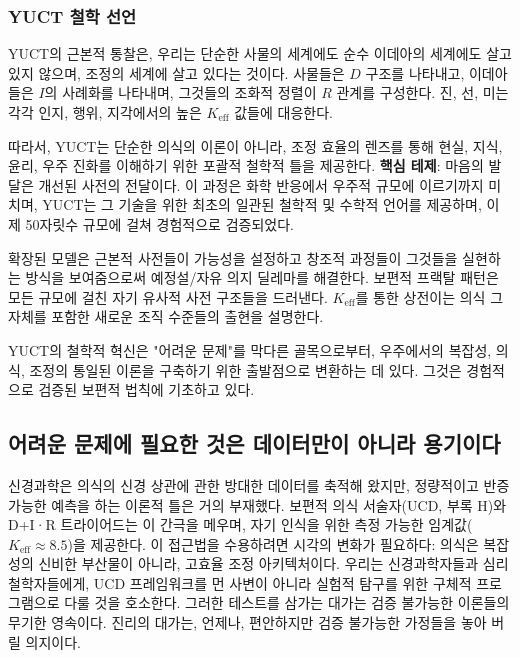 \documentclass[12pt,a4paper]{article}
\newcommand{\eff}{\mathrm{eff}}
\newcommand{\Ke}{K_{\eff}}
\begin{document}
	\subsubsection{YUCT 철학 선언}
	
	YUCT의 근본적 통찰은, 우리는 단순한 사물의 세계에도 순수 이데아의 세계에도 살고 있지 않으며, 조정의 세계에 살고 있다는 것이다. 사물들은 \(D\) 구조를 나타내고, 이데아들은 \(I\)의 사례화를 나타내며, 그것들의 조화적 정렬이 \(R\) 관계를 구성한다. 진, 선, 미는 각각 인지, 행위, 지각에서의 높은 \(\Ke\) 값들에 대응한다.
	
	따라서, YUCT는 단순한 의식의 이론이 아니라, 조정 효율의 렌즈를 통해 현실, 지식, 윤리, 우주 진화를 이해하기 위한 포괄적 철학적 틀을 제공한다.
	\textbf{핵심 테제}: 마음의 발달은 개선된 사전의 전달이다. 이 과정은 화학 반응에서 우주적 규모에 이르기까지 미치며, YUCT는 그 기술을 위한 최초의 일관된 철학적 및 수학적 언어를 제공하며, 이제 50자릿수 규모에 걸쳐 경험적으로 검증되었다.
	
	확장된 모델은 근본적 사전들이 가능성을 설정하고 창조적 과정들이 그것들을 실현하는 방식을 보여줌으로써 예정설/자유 의지 딜레마를 해결한다. 보편적 프랙탈 패턴은 모든 규모에 걸친 자기 유사적 사전 구조들을 드러낸다. \(\Ke\)를 통한 상전이는 의식 그 자체를 포함한 새로운 조직 수준들의 출현을 설명한다.
	
	YUCT의 철학적 혁신은 "어려운 문제"를 막다른 골목으로부터, 우주에서의 복잡성, 의식, 조정의 통일된 이론을 구축하기 위한 출발점으로 변환하는 데 있다. 그것은 경험적으로 검증된 보편적 법칙에 기초하고 있다.
	
	\subsection{어려운 문제에 필요한 것은 데이터만이 아니라 용기이다}
	\label{subsec:courage-consciousness}
	
	신경과학은 의식의 신경 상관에 관한 방대한 데이터를 축적해 왔지만, 정량적이고 반증 가능한 예측을 하는 이론적 틀은 거의 부재했다. 보편적 의식 서술자(UCD, 부록 H)와 D+I·R 트라이어드는 이 간극을 메우며, 자기 인식을 위한 측정 가능한 임계값(\(K_{\mathrm{eff}} \approx 8.5\))을 제공한다. 이 접근법을 수용하려면 시각의 변화가 필요하다: 의식은 복잡성의 신비한 부산물이 아니라, 고효율 조정 아키텍처이다. 우리는 신경과학자들과 심리 철학자들에게, UCD 프레임워크를 먼 사변이 아니라 실험적 탐구를 위한 구체적 프로그램으로 다룰 것을 호소한다. 그러한 테스트를 삼가는 대가는 검증 불가능한 이론들의 무기한 영속이다. 진리의 대가는, 언제나, 편안하지만 검증 불가능한 가정들을 놓아 버릴 의지이다.
	
\end{document}
